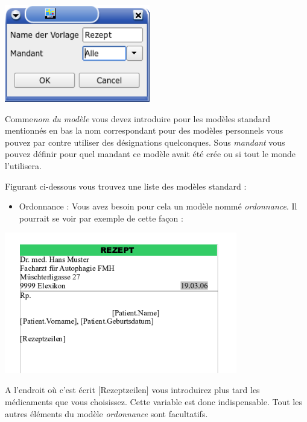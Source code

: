 \includegraphics[width=2.5in]{images/rezept1.png}

 Comme\textit{nom du modèle} vous devez introduire pour les modèles standard mentionnés en bas la nom correspondant pour des modèles personnels vous pouvez par contre utiliser des désignations quelconques. Sous  \textit{mandant} vous pouvez définir pour quel mandant ce modèle avait été crée ou si tout le monde l'utilisera.
 
Figurant ci-dessous vous trouvez une liste des modèles standard :


\begin{itemize}
\item Ordonnance : Vous avez besoin pour cela un modèle nommé \textit{ordonnance}. Il pourrait se voir par exemple de cette façon :
 \end{itemize}
\includegraphics[width=4in]{images/rezept.png}

A l'endroit où c'est écrit  [Rezeptzeilen] vous introduirez plus tard les médicaments que vous choisissez. Cette variable est donc indispensable. Tout les autres éléments du modèle \textit{ordonnance} sont facultatifs.

